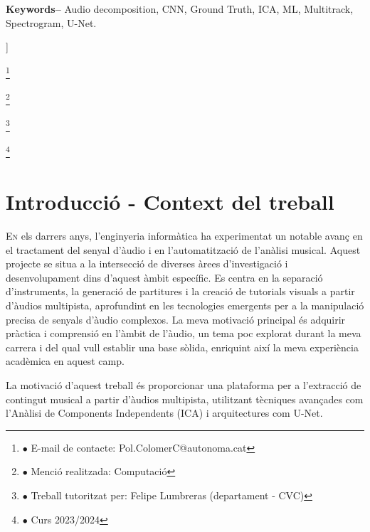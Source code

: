 \documentclass[10pt,a4paper,twocolumn,twoside]{article}
\newcommand\blfootnote[1]{%
  \begin{NoHyper}
  \renewcommand\thefootnote{}\footnote{#1}%
  \addtocounter{footnote}{-1}%
  \end{NoHyper}
}
\begin{document}
\begin{@twocolumnfalse}
\begin{center}
{\\
\\
\textbf{Keywords-- } Audio decomposition, CNN, Ground Truth, ICA, ML, Multitrack, Spectrogram, U-Net.\\
}

\bigskip

{\vrule depth 0pt height 0.5pt width 4cm\hspace{7.5pt}%
%
\hspace{7.5pt}\vrule depth 0pt height 0.5pt width 4cm\relax}

\end{center}

\bigskip
\end{@twocolumnfalse}]

\blfootnote{$\bullet$ E-mail de contacte: Pol.ColomerC@autonoma.cat}
\blfootnote{$\bullet$ Menció realitzada: Computació}
\blfootnote{$\bullet$ Treball tutoritzat per: Felipe Lumbreras (departament - CVC)}
\blfootnote{$\bullet$ Curs 2023/2024}

\vspace*{-1cm}
\section{Introducció - Context del treball}
\label{sec:intro}

\lettrine[lines=3]{E}{n} els darrers anys, l'enginyeria informàtica ha experimentat un notable avanç en el tractament del senyal d'àudio i en l'automatització de l'anàlisi musical. Aquest projecte se situa a la intersecció de diverses àrees d'investigació i desenvolupament dins d'aquest àmbit específic. Es centra en la separació d'instruments, la generació de partitures i la creació de tutorials visuals a partir d'àudios multipista, aprofundint en les tecnologies emergents per a la manipulació precisa de senyals d'àudio complexos. La meva motivació principal és adquirir pràctica i comprensió en l'àmbit de l'àudio, un tema poc explorat durant la meva carrera i del qual vull establir una base sòlida, enriquint així la meva experiència acadèmica en aquest camp.

La motivació d'aquest treball és proporcionar una plataforma per a l'extracció de contingut musical a partir d'àudios multipista, utilitzant tècniques avançades com l'Anàlisi de Components Independents (ICA) i arquitectures com U-Net.
\end{document}
